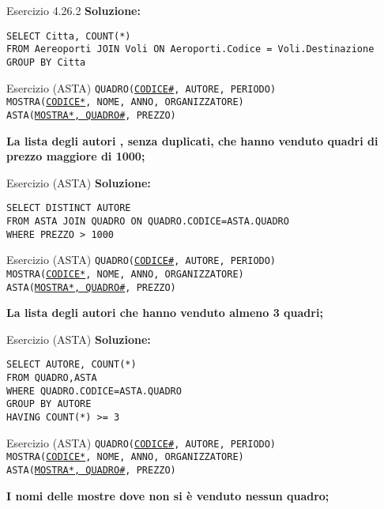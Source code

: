 \begin{frame}{Esercizio 4.26.2}
    \textbf{Soluzione:}
    \vspace{1em}
    
    \texttt{SELECT Citta, COUNT(*)\\FROM Aereoporti JOIN Voli ON Aeroporti.Codice = Voli.Destinazione \\GROUP BY Citta}
    \end{frame}
\begin{frame}{Esercizio (ASTA)} 
    \texttt{QUADRO(\underline{CODICE\#}, AUTORE, PERIODO)\\
    MOSTRA(\underline{CODICE*}, NOME, ANNO, ORGANIZZATORE)\\
    ASTA(\underline{MOSTRA*, QUADRO\#}, PREZZO)}
    \vspace{1em}
    
    \textbf{La lista degli autori , senza duplicati, che hanno venduto
quadri di prezzo maggiore di 1000;}
\end{frame}

\begin{frame}{Esercizio (ASTA)}
    \textbf{Soluzione:}
    \vspace{1em}
    
    \texttt{SELECT DISTINCT AUTORE\\FROM ASTA JOIN QUADRO ON QUADRO.CODICE=ASTA.QUADRO\\WHERE
PREZZO > 1000}
    \end{frame}
\begin{frame}{Esercizio (ASTA) } 
    \texttt{QUADRO(\underline{CODICE\#}, AUTORE, PERIODO)\\
    MOSTRA(\underline{CODICE*}, NOME, ANNO, ORGANIZZATORE)\\
    ASTA(\underline{MOSTRA*, QUADRO\#}, PREZZO)}
    \vspace{1em}
    
    \textbf{La lista degli autori che hanno venduto almeno 3 quadri;}
\end{frame}

\begin{frame}{Esercizio (ASTA)}
    \textbf{Soluzione:}
    \vspace{1em}
    
    \texttt{SELECT AUTORE, COUNT(*)\\FROM QUADRO,ASTA\\WHERE QUADRO.CODICE=ASTA.QUADRO\\GROUP BY AUTORE
\\HAVING COUNT(*) >= 3}
    \end{frame}
\begin{frame}{Esercizio (ASTA) } 
    \texttt{QUADRO(\underline{CODICE\#}, AUTORE, PERIODO)\\
    MOSTRA(\underline{CODICE*}, NOME, ANNO, ORGANIZZATORE)\\
    ASTA(\underline{MOSTRA*, QUADRO\#}, PREZZO)}
    \vspace{1em}
    
    \textbf{I nomi delle mostre dove non si \`e venduto nessun quadro;}
\end{frame}


